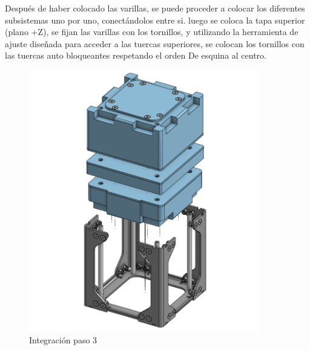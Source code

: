       Después de haber colocado las varillas, se puede
      proceder a colocar los diferentes subsistemas uno por uno, conectándolos entre si. luego
      se coloca la tapa superior (plano +Z), se fijan las varillas con los tornillos, y utilizando la
      herramienta de ajuste diseñada para acceder a las tuercas superiores, se colocan los tornillos
      con las tuercas auto bloqueantes respetando el orden De esquina al centro.

      \begin{figure}[H]
        \begin{minipage}{0.49\textwidth}
          \centering
          \includegraphics[width=0.9\textwidth]{image/structure/integracion3.png}
          \caption{Integración paso 3}
          \label{fig:integracion3}
        \end{minipage}
        \begin{minipage}{0.49\textwidth}
          \centering

\end{minipage}
\end{figure}
